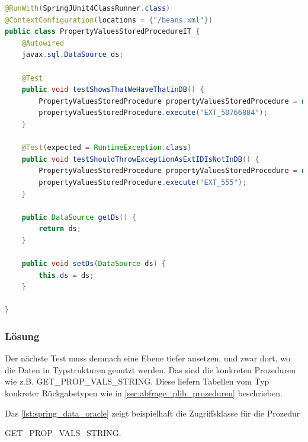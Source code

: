 \begin{lstlisting}[caption=Spring Data Oracle - Testklasse zum Aufruf der Hilfsprozeduren, language=java, label=lst:spring_data_hilf_test]
@RunWith(SpringJUnit4ClassRunner.class)
@ContextConfiguration(locations = {"/beans.xml"})
public class PropertyValuesStoredProcedureIT {
    @Autowired
    javax.sql.DataSource ds;

    @Test
    public void testShowsThatWeHaveThatinDB() {
        PropertyValuesStoredProcedure propertyValuesStoredProcedure = new PropertyValuesStoredProcedure(ds);
        propertyValuesStoredProcedure.execute("EXT_50766884");
    }

    @Test(expected = RuntimeException.class)
    public void testShouldThrowExceptionAsExtIDIsNotInDB() {
        PropertyValuesStoredProcedure propertyValuesStoredProcedure = new PropertyValuesStoredProcedure(ds);
        propertyValuesStoredProcedure.execute("EXT_555");
    }

    public DataSource getDs() {
        return ds;
    }

    public void setDs(DataSource ds) {
        this.ds = ds;
    }

}
\end{lstlisting}

\subsubsection{Lösung}

Der nächste Test muss demnach eine Ebene tiefer ansetzen, und zwar dort, wo die Daten in Typstrukturen genutzt werden. Das sind die konkreten Prozeduren wie z.B. GET\_PROP\_VALS\_STRING. Diese liefern Tabellen vom Typ konkreter Rückgabetypen wie in \autoref{sec:abfrage_plib_prozeduren} beschrieben. 

Das \autoref{lst:spring_data_oracle} zeigt beispielhaft die Zugriffsklasse für die Prozedur 

GET\_PROP\_VALS\_STRING.

